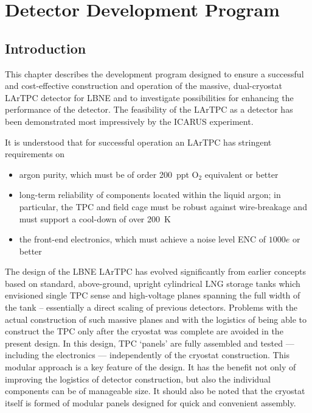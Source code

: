 %
%
\chapter{Detector Development Program}
\label{ch:randd}


\section{Introduction}
This chapter describes the development program designed to ensure a successful and cost-effective construction and operation of the massive, dual-cryostat LArTPC detector for LBNE and to investigate possibilities for enhancing the performance of the detector. The feasibility of the LArTPC as a detector has been demonstrated most impressively by the  ICARUS experiment. 

It is understood that for successful operation an LArTPC has stringent requirements on
\begin{itemize}
 \item argon purity, which must be of order 200~ppt O$_2$ equivalent or better
 \item long-term reliability of components located within the liquid argon; in particular, the TPC and field cage must be robust against wire-breakage and must support a cool-down of over 200~K
 \item the front-end electronics, which must achieve a noise level ENC of $1000 e$ or better
\end{itemize}

The design of the LBNE LArTPC has evolved significantly from earlier concepts based on standard, above-ground, upright cylindrical LNG storage tanks which envisioned single TPC sense and high-voltage planes spanning the full width of the tank -- essentially a direct scaling of previous detectors. Problems with the actual construction of such massive planes and with the logistics of being able to construct the TPC only after the cryostat was complete are avoided in the present design. In this design,  TPC `panels'  are fully assembled and tested  --- including the electronics ---  independently of the cryostat construction. This modular approach is a key feature of the design. It has the benefit not only of improving the logistics of detector construction, but also the individual components can be of manageable size. It should also be noted that the cryostat itself is formed of modular panels designed for quick and convenient assembly.

